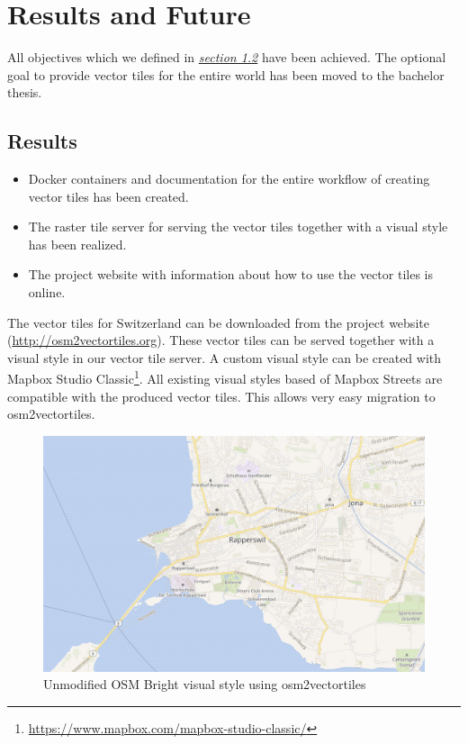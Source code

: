 \chapter{Results and Future}\label{part1_results_and_future}

All objectives which we defined in \hyperref[targets]{\emph{section 1.2}} have been achieved. The optional goal to provide vector tiles for the entire world has been moved to the bachelor thesis.

\section{Results}\label{part1_results}

\begin{itemize}
\item
  Docker containers and documentation for the entire workflow of creating vector tiles has been created.
\item
  The raster tile server for serving the vector tiles together with a visual style has been realized.
\item
  The project website with information about how to use the vector tiles is online.
\end{itemize}

The vector tiles for Switzerland can be downloaded from the project website (\url{http://osm2vectortiles.org}). These vector tiles can be served together with a visual style in our vector tile server.
\newline{}
A custom visual style can be created with Mapbox Studio Classic\footnote{\url{https://www.mapbox.com/mapbox-studio-classic/}}.
All existing visual styles based of Mapbox Streets are compatible with the produced vector tiles. This allows very easy migration to osm2vectortiles.

\begin{figure}[H]
  \includegraphics[width=1\textwidth]{images/unmodified_osm_bright.png}
  \caption{Unmodified OSM Bright visual style using osm2vectortiles}
\end{figure}

